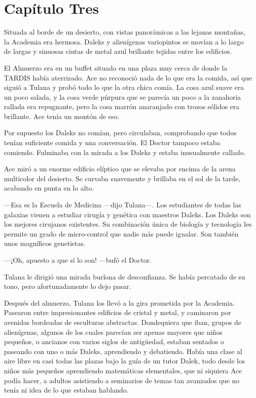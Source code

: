 \chapter*{Capítulo Tres}

Situada al borde de un desierto, con vistas panorámicas a las
lejanas montañas, la Academia era hermosa. Daleks y alienígenas
variopintos se movían a lo largo de largas y sinuosas cintas de metal
azul brillante tejidas entre los edificios.

El Almuerzo era en un buffet situado en una plaza muy cerca de donde la
TARDIS había aterrizado. Ace no reconoció nada de lo que era la comida,
así que siguió a Tulana y probó todo lo que la otra chica comía. La
cosa azul suave era un poco salada, y la cosa verde púrpura que se
parecía un poco a la zanahoria rallada era repugnante, pero la cosa
marrón anaranjado con trozos sólidos era brillante. Ace tenía un montón
de eso.

Por supuesto los Daleks no comían, pero circulaban, comprobando
que todos tenían suficiente comida y una conversación. El Doctor tampoco
estaba comiendo. Fulminaba con la mirada a los Daleks y estaba
inusualmente callado.

Ace miró a un enorme edificio elíptico que se elevaba por encima
de la arena multicolor del desierto. Se curvaba suavemente y brillaba en
el sol de la tarde, acabando en punta en lo alto.

---Esa es la Escuela de Medicina ---dijo Tulana---. Los
estudiantes de todas las galaxias vienen a estudiar cirugía y genética
con maestros Daleks. Los Daleks son los mejores cirujanos existentes. Su
combinación única de biología y tecnología les permite un grado de
micro-control que nadie más puede igualar. Son también unos magníficos
genetistas.

---¡Oh, apuesto a que sí lo son! ---bufó el Doctor.

Tulana le dirigió una mirada burlona de desconfianza. Se había
percatado de su tono, pero afortunadamente lo dejo pasar.

Después del almuerzo, Tulana los llevó a la gira prometida por
la Academia. Pasearon entre impresionantes edificios de cristal y metal,
y caminaron por avenidas bordeadas de esculturas abstractas. Dondequiera
que iban, grupos de alienígenas, algunos de los cuales parecían ser
apenas mayores que niños pequeños, o ancianos con varios siglos de
antigüedad, estaban sentados o paseando con uno o más Daleks,
aprendiendo y debatiendo. Había una clase al aire libre en casi todas
las plazas bajo la guía de un tutor Dalek, todo desde los niños más
pequeños aprendiendo matemáticas elementales, que ni siquiera Ace podía
hacer, a adultos asistiendo a seminarios de temas tan avanzados que no
tenía ni idea de lo que estaban hablando.

